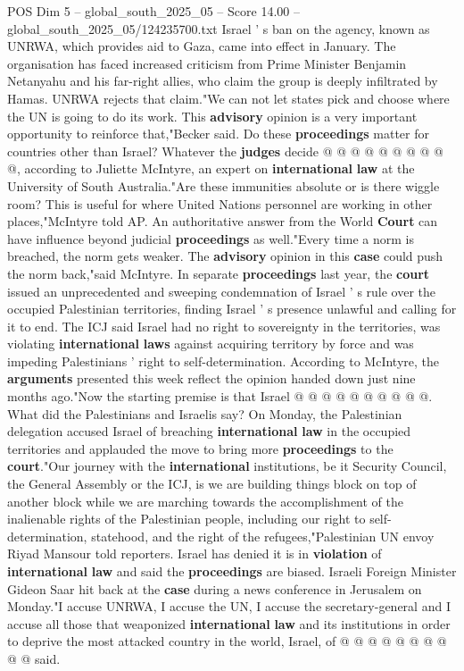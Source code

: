 \begin{textsample}{POS Dim 5 – global\_south\_2025\_05 – Score 14.00 – global\_south\_2025\_05/124235700.txt}
Israel ' s ban on the agency, known as UNRWA, which provides aid to Gaza, came into effect in January.
The organisation has faced increased criticism from Prime Minister Benjamin Netanyahu and his far-right allies, who claim the group is deeply infiltrated by Hamas.
UNRWA rejects that claim."We can not let states pick and choose where the UN is going to do its work.
This \textbf{advisory} opinion is a very important opportunity to reinforce that,"Becker said.
Do these \textbf{proceedings} matter for countries other than Israel?
Whatever the \textbf{judges} decide @ @ @ @ @ @ @ @ @ @, according to Juliette McIntyre, an expert on \textbf{international} \textbf{law} at the University of South Australia."Are these immunities absolute or is there wiggle room?
This is useful for where United Nations personnel are working in other places,"McIntyre told AP.
An authoritative answer from the World \textbf{Court} can have influence beyond judicial \textbf{proceedings} as well."Every time a norm is breached, the norm gets weaker.
The \textbf{advisory} opinion in this \textbf{case} could push the norm back,"said McIntyre.
In separate \textbf{proceedings} last year, the \textbf{court} issued an unprecedented and sweeping condemnation of Israel ' s rule over the occupied Palestinian territories, finding Israel ' s presence unlawful and calling for it to end.
The ICJ said Israel had no right to sovereignty in the territories, was violating \textbf{international} \textbf{laws} against acquiring territory by force and was impeding Palestinians ' right to self-determination.
According to McIntyre, the \textbf{arguments} presented this week reflect the opinion handed down just nine months ago."Now the starting premise is that Israel @ @ @ @ @ @ @ @ @ @.
What did the Palestinians and Israelis say?
On Monday, the Palestinian delegation accused Israel of breaching \textbf{international} \textbf{law} in the occupied territories and applauded the move to bring more \textbf{proceedings} to the \textbf{court}."Our journey with the \textbf{international} institutions, be it Security Council, the General Assembly or the ICJ, is we are building things block on top of another block while we are marching towards the accomplishment of the inalienable rights of the Palestinian people, including our right to self-determination, statehood, and the right of the refugees,"Palestinian UN envoy Riyad Mansour told reporters.
Israel has denied it is in \textbf{violation} of \textbf{international} \textbf{law} and said the \textbf{proceedings} are biased.
Israeli Foreign Minister Gideon Saar hit back at the \textbf{case} during a news conference in Jerusalem on Monday."I accuse UNRWA, I accuse the UN, I accuse the secretary-general and I accuse all those that weaponized \textbf{international} \textbf{law} and its institutions in order to deprive the most attacked country in the world, Israel, of @ @ @ @ @ @ @ @ @ @ said.

\end{textsample}
